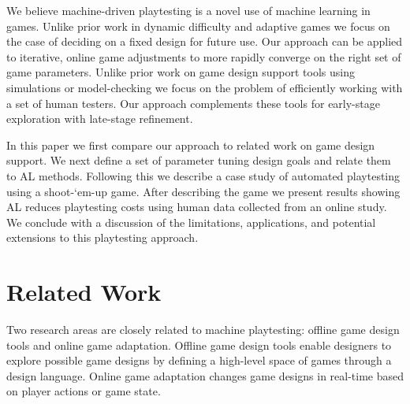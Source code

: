\documentclass{sig-alternate}
\begin{document}
We believe machine-driven playtesting is a novel use of machine learning in games.
Unlike prior work in dynamic difficulty and adaptive games we focus on the case of deciding on a fixed design for future use.
Our approach can be applied to iterative, online game adjustments to more rapidly converge on the right set of game parameters.
Unlike prior work on game design support tools using simulations or model-checking we focus on the problem of efficiently working with a set of human testers.
Our approach complements these tools for early-stage exploration with late-stage refinement.

In this paper we first compare our approach to related work on game design support.
We next define a set of parameter tuning design goals and relate them to AL methods.
Following this we describe a case study of automated playtesting using a shoot-`em-up game.
After describing the game we present results showing AL reduces playtesting costs using human data collected from an online study.
We conclude with a discussion of the limitations, applications, and potential extensions to this playtesting approach.




\section{Related Work}

Two research areas are closely related to machine playtesting: offline game design tools and online game adaptation.
Offline game design tools enable designers to explore possible game designs by defining a high-level space of games through a design language.
Online game adaptation changes game designs in real-time based on player actions or game state.
\end{document}
